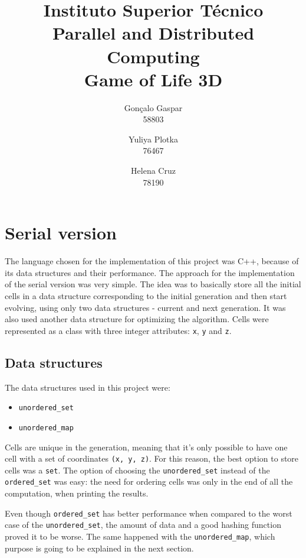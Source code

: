 \documentclass[11pt,english]{article}
\author{
\begin{tabular}{c}
    Gonçalo Gaspar \\
    58803
\end{tabular}
    \and
\begin{tabular}{c}
    Yuliya Plotka \\ 
    76467
\end{tabular}
    \and
\begin{tabular}{c}
    Helena Cruz \\ 
    78190
\end{tabular}
\vspace{0.01cm}
}
\title{
    \vspace{-2cm}
    \large Instituto Superior Técnico \\
    \Large Parallel and Distributed Computing \\
    \medbreak
    \LARGE  Game of Life 3D
}
\date{\vspace{-5ex}}
\begin{document}
\maketitle


\section{Serial version}

The language chosen for the implementation of this project was C++, because of 
its data structures and their performance.
The approach for the implementation of the serial version was very simple. The 
idea was to basically store all the initial cells in a data structure 
corresponding to the initial generation and then start evolving, using only two
data structures - current and next generation. It was also used another data 
structure for optimizing the algorithm. 
Cells were represented as a class with three integer attributes: \texttt{x}, 
\texttt{y} and \texttt{z}. 

\subsection{Data structures}

The data structures used in this project were:

\begin{itemize}[noitemsep]
    \item \texttt{unordered\_set}
    \item \texttt{unordered\_map}
\end{itemize}

Cells are unique in the generation, meaning that it's only possible to have one
cell with a set of coordinates \texttt{(x, y, z)}. For this reason, the best 
option to store cells was a \texttt{set}. The option of choosing the 
\texttt{unordered\_set} instead of the \texttt{ordered\_set} was easy: the need 
for ordering cells was only in the end of all the computation, when printing 
the results. 

Even though \texttt{ordered\_set} has better performance when compared to the 
worst case of the \texttt{unordered\_set}, the amount of data and a good 
hashing function proved it to be worse. The same happened with the 
\texttt{unordered\_map}, which purpose is going to be explained in the next 
section.
\end{document}
